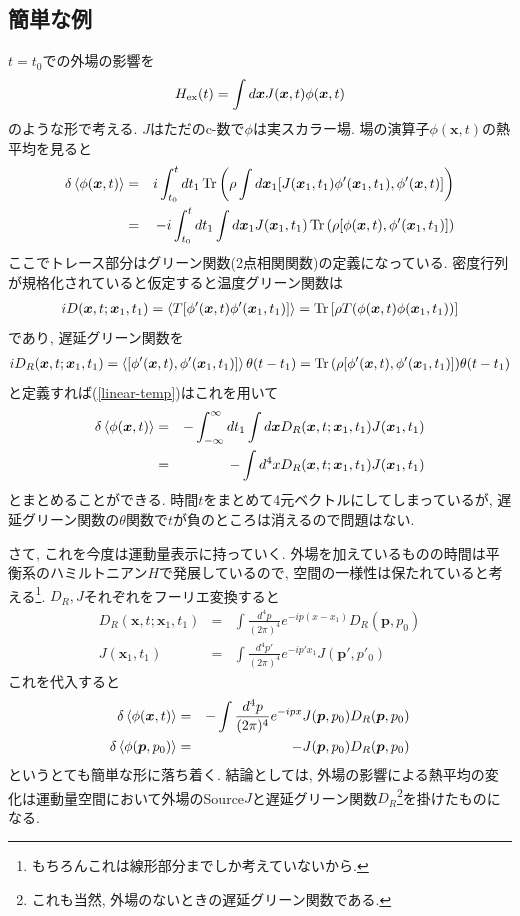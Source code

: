 \documentclass[10.5pt,a4paper]{jreport}
\begin{document}
\subsection{簡単な例}
$t = t_0$での外場の影響を
\begin{eqnarray}
  H_{\rm ex}(t) = \int d\bm{x} J(\bm{x}, t)\phi(\bm{x}, t)
\end{eqnarray}
のような形で考える. $J$はただのc-数で$\phi$は実スカラー場. 場の演算子$\phi(\bm{x}, t)$の熱平均を見ると
\begin{eqnarray}
  \delta\ev{\phi(\bm{x}, t)} &=& i\int_{t_0}^{t}dt_1 \Tr\qty(\rho\int d\bm{x}_1 \qty[J(\bm{x}_1, t_1)\phi'(\bm{x}_1, t_1), \phi'(\bm{x}, t)])\\
  &=& -i\int_{t_0}^{t}dt_1\int d\bm{x}_1J(\bm{x}_1, t_1)\Tr\qty(\rho\qty[\phi(\bm{x}, t), \phi'(\bm{x}_1, t_1)])\label{linear-temp}
\end{eqnarray}
ここでトレース部分はグリーン関数(2点相関関数)の定義になっている. 密度行列が規格化されていると仮定すると温度グリーン関数は
\begin{eqnarray}
  iD(\bm{x}, t; \bm{x}_1, t_1) =\ev{T\qty[\phi'(\bm{x}, t)\phi'(\bm{x}_1, t_1)]} = \Tr\qty[\rho T\qty(\phi(\bm{x}, t)\phi(\bm{x}_1, t_1))]
\end{eqnarray}
であり, 遅延グリーン関数を
\begin{eqnarray}
  iD_R(\bm{x}, t; \bm{x}_1, t_1) = \ev{[\phi'(\bm{x}, t), \phi'(\bm{x}_1, t_1)]}\theta(t-t_1) = \Tr\qty(\rho[\phi'(\bm{x}, t), \phi'(\bm{x}_1, t_1)])\theta(t-t_1)
\end{eqnarray}
と定義すれば(\ref{linear-temp})はこれを用いて
\begin{eqnarray}
  \delta\ev{\phi(\bm{x}, t)} &=& -\int_{-\infty}^\infty dt_1\int d\bm{x} D_R(\bm{x}, t; \bm{x}_1, t_1)J(\bm{x}_1, t_1)\\
  &=& -\int d^4xD_R(\bm{x}, t; \bm{x}_1, t_1)J(\bm{x}_1, t_1)
\end{eqnarray}
とまとめることができる. 時間$t$をまとめて4元ベクトルにしてしまっているが, 遅延グリーン関数の$\theta$関数で$t$が負のところは消えるので問題はない.

さて, これを今度は運動量表示に持っていく. 外場を加えているものの時間は平衡系のハミルトニアン$H$で発展しているので, 空間の一様性は保たれていると考える\footnote{もちろんこれは線形部分までしか考えていないから. }. $D_R, J$それぞれをフーリエ変換すると
\begin{eqnarray}
  D_R(\bm{x}, t; \bm{x}_1, t_1) &=& \int\frac{d^4p}{(2\pi)^4} e^{-ip(x-x_1)}D_R(\bm{p}, p_0)\\
  J(\bm{x}_1, t_1) &=& \int\frac{d^4p'}{(2\pi)^4}e^{-ip'x_1}J(\bm{p}', p'_0)
\end{eqnarray}
これを代入すると
\begin{eqnarray}
  \delta\ev{\phi(\bm{x}, t)} &=& -\int \frac{d^4p}{(2\pi)^4} e^{-ipx}J(\bm{p}, p_0)D_R(\bm{p}, p_0)\\
  \delta\ev{\phi(\bm{p}, p_0)} &=& -J(\bm{p}, p_0)D_R(\bm{p}, p_0)
\end{eqnarray}
というとても簡単な形に落ち着く. 結論としては, 外場の影響による熱平均の変化は運動量空間において外場のSource$J$と遅延グリーン関数$D_R$\footnote{これも当然, 外場のないときの遅延グリーン関数である. }を掛けたものになる.
\newpage
\end{document}
